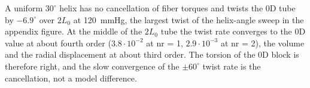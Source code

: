 A uniform $30^\circ$ helix has no cancellation of fiber torques and twists the 0D tube by
$-6.9^\circ$ over $2L_0$ at 120~mmHg, the largest twist of the helix-angle sweep in the
appendix figure. At the middle of the $2L_0$ tube the twist rate converges to the 0D value
at about fourth order ($3.8\cdot10^{-2}$ at nr = 1, $2.9\cdot10^{-3}$ at nr = 2), the volume
and the radial displacement at about third order. The torsion of the 0D block is
therefore right, and the slow convergence of the $\pm60^\circ$ twist rate is the
cancellation, not a model difference.
